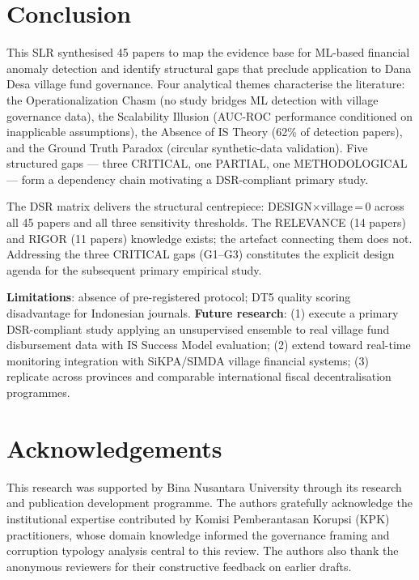 \documentclass[3p,times,procedia]{elsarticle}
\begin{document}
\section{Conclusion}
\label{sec:conclusion}

This SLR synthesised 45 papers to map the evidence base for ML-based financial anomaly detection and identify structural gaps that preclude application to Dana Desa village fund governance. Four analytical themes characterise the literature: the Operationalization Chasm (no study bridges ML detection with village governance data), the Scalability Illusion (AUC-ROC performance conditioned on inapplicable assumptions), the Absence of IS Theory (62\% of detection papers), and the Ground Truth Paradox (circular synthetic-data validation). Five structured gaps --- three CRITICAL, one PARTIAL, one METHODOLOGICAL --- form a dependency chain motivating a DSR-compliant primary study.

The DSR matrix delivers the structural centrepiece: DESIGN$\times$village\,=\,0 across all 45 papers and all three sensitivity thresholds. The RELEVANCE (14 papers) and RIGOR (11 papers) knowledge exists; the artefact connecting them does not. Addressing the three CRITICAL gaps (G1--G3) constitutes the explicit design agenda for the subsequent primary empirical study.

\textbf{Limitations}: absence of pre-registered protocol; DT5 quality scoring disadvantage for Indonesian journals. \textbf{Future research}: (1) execute a primary DSR-compliant study applying an unsupervised ensemble to real village fund disbursement data with IS Success Model evaluation; (2) extend toward real-time monitoring integration with SiKPA/SIMDA village financial systems; (3) replicate across provinces and comparable international fiscal decentralisation programmes.

\section*{Acknowledgements}
This research was supported by Bina Nusantara University through its research and publication development programme. The authors gratefully acknowledge the institutional expertise contributed by Komisi Pemberantasan Korupsi (KPK) practitioners, whose domain knowledge informed the governance framing and corruption typology analysis central to this review. The authors also thank the anonymous reviewers for their constructive feedback on earlier drafts.
\end{document}

